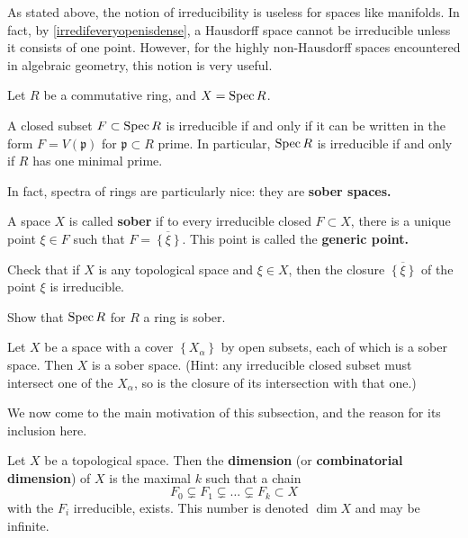 As stated above, the  notion of irreducibility is useless for spaces
like manifolds. In fact, by \cref{irredifeveryopenisdense}, a
Hausdorff space cannot be irreducible unless it consists of one point.
However, for the highly non-Hausdorff spaces encountered in algebraic geometry, this notion is very
useful.

Let $R$ be a commutative ring, and $X = \operatorname{Spec} R$.

\begin{exercise} 
A closed subset $F \subset \operatorname{Spec} R$ is irreducible if and only if it can be
written in the form $F = V(\mathfrak{p})$ for $\mathfrak{p} \subset R$ prime.
In particular, $\operatorname{Spec} R$ is irreducible if and only if $R$ has one minimal
prime. 
\end{exercise} 

In fact, spectra of rings are particularly nice: they are \textbf{sober
spaces.}
\begin{definition} 
A space $X$ is called \textbf{sober} if to every irreducible closed $F \subset
X$, there is a unique point $\xi \in F$ such that $F = \overline{ \left\{\xi\right\}}$. 
This point is called the \textbf{generic point.}
\end{definition} 

\begin{exercise} 
Check that if $X$ is any topological space and $\xi  \in X$, then the closure
$\overline{\left\{\xi\right\}}$ of the point $\xi$ is irreducible.
\end{exercise} 

\begin{exercise} 
Show that $\operatorname{Spec} R$ for $R$ a ring is sober.
\end{exercise} 

\begin{exercise} 
Let $X$ be a space with a cover $\left\{X_\alpha\right\}$ by open subsets,
each of which is a sober space. Then $X$ is a sober space. (Hint: any
irreducible closed subset must intersect one of the $X_\alpha$, so is the
closure of its intersection with that one.)
\end{exercise} 

We now come to the main motivation of this subsection, and the reason for its
inclusion here.

\begin{definition} 
Let $X$ be a topological space. Then the \textbf{dimension} (or
\textbf{combinatorial dimension}) of $X$ is the maximal $k$ such that a chain
\[ F_0 \subsetneq F_1 \subsetneq \dots \subsetneq F_k \subset X  \]
with the $F_i$ irreducible, exists. This number is denoted $\dim X$ and may be
infinite.
\end{definition} 

